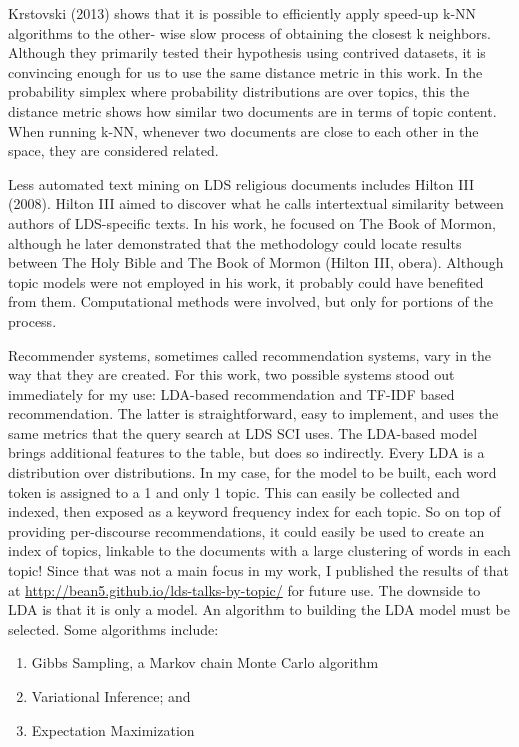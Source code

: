 Krstovski (2013) shows that it is possible to efficiently apply speed-up k-NN algorithms to the other- wise slow process of obtaining the closest k neighbors. Although they primarily tested their hypothesis using contrived datasets, it is convincing enough for us to use the same distance metric in this work. In the probability simplex where probability distributions are over topics, this the distance metric shows how similar two documents are in terms of topic content. When running k-NN, whenever two documents are close to each other in the space, they are considered related.

Less automated text mining on LDS religious documents includes Hilton III (2008). Hilton III aimed to discover what he calls intertextual similarity between authors of LDS-specific texts. In his work, he focused on The Book of Mormon, although he later demonstrated that the methodology could locate results between The Holy Bible and The Book of Mormon (Hilton III, obera). Although topic models were not employed in his work, it probably could have benefited from them. Computational methods were involved, but only for portions of the process.

Recommender systems, sometimes called recommendation systems, vary in the way that they are created. For this work, two possible systems stood out immediately for my use: LDA-based recommendation and TF-IDF based recommendation. The latter is straightforward, easy to implement, and uses the same metrics that the query search at LDS SCI uses. The LDA-based model brings additional features to the table, but does so indirectly. Every LDA is a distribution over distributions. In my case, for the model to be built, each word token is assigned to a 1 and only 1 topic. This can easily be collected and indexed, then exposed as a keyword frequency index for each topic. So on top of providing per-discourse recommendations, it could easily be used to create an index of topics, linkable to the documents with a large clustering of words in each topic! Since that was not a main focus in my work, I published the results of that at \url{http://bean5.github.io/lds-talks-by-topic/} for future use. The downside to LDA is that it is only a model. An algorithm to building the LDA model must be selected. Some algorithms include:

\begin{enumerate}
  \item Gibbs Sampling, a Markov chain Monte Carlo algorithm
  \item Variational Inference; and
  \item Expectation Maximization
\end{enumerate}

